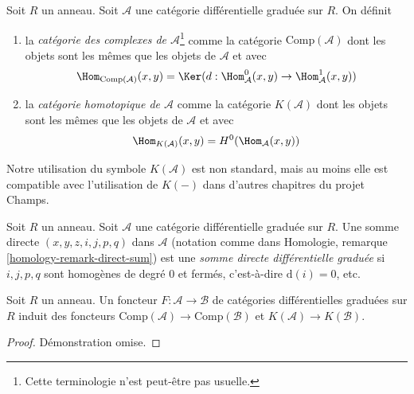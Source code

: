 \begin{definition}
\label{definition-homotopy-category-of-dga-category}
Soit $R$ un anneau. Soit $\mathcal{A}$ une catégorie différentielle
graduée sur $R$. On définit
\begin{enumerate}
\item la {\it catégorie des complexes de $\mathcal{A}$}\footnote{Cette
terminologie n'est peut-être pas usuelle.} comme la
catégorie $\text{Comp}(\mathcal{A})$ dont les objets sont les mêmes que les
objets de $\mathcal{A}$ et avec
$$
\Hom_{\text{Comp}(\mathcal{A})}(x, y) =
\Ker(d : \Hom^0_\mathcal{A}(x, y) \to \Hom^1_\mathcal{A}(x, y))
$$
\item la {\it catégorie homotopique de $\mathcal{A}$} comme la
catégorie $K(\mathcal{A})$ dont les objets sont les mêmes que les
objets de $\mathcal{A}$ et avec
$$
\Hom_{K(\mathcal{A})}(x, y) = H^0(\Hom_\mathcal{A}(x, y))
$$
\end{enumerate}
\end{definition}

\noindent
Notre utilisation du symbole $K(\mathcal{A})$ est non standard, mais au moins
elle est compatible avec l'utilisation de $K(-)$ dans d'autres chapitres du projet Champs.

\begin{definition}
\label{definition-dg-direct-sum}
Soit $R$ un anneau. Soit $\mathcal{A}$ une catégorie différentielle graduée sur
$R$. Une somme directe $(x, y, z, i, j, p, q)$ dans $\mathcal{A}$ (notation comme dans
Homologie, remarque \ref{homology-remark-direct-sum})
est une {\it somme directe différentielle graduée} si $i, j, p, q$ sont homogènes
de degré $0$ et fermés, c'est-à-dire $\text{d}(i) = 0$, etc.
\end{definition}

\begin{lemma}
\label{lemma-functorial}
Soit $R$ un anneau. Un foncteur $F : \mathcal{A} \to \mathcal{B}$
de catégories différentielles graduées sur $R$ induit des
foncteurs $\text{Comp}(\mathcal{A}) \to
\text{Comp}(\mathcal{B})$ et $K(\mathcal{A}) \to K(\mathcal{B})$.
\end{lemma}

\begin{proof}
Démonstration omise.
\end{proof}


